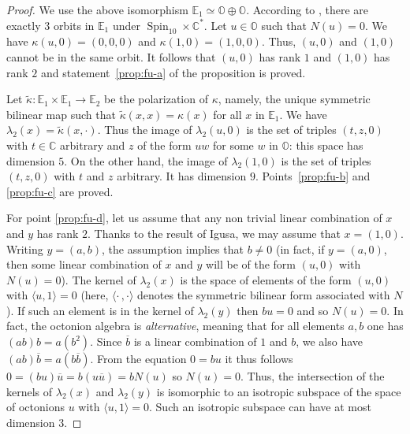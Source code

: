 \documentclass[10pt]{amsart}
\newcommand{\citestar}[3]{\cite[#3]{#1}}
\theoremstyle{plain}
\theoremstyle{definition}
\let\ov\overline
\DeclareMathOperator{\Spin}{Spin}
\newcommand{\bC}{\mathbb{C}}
\newcommand{\bE}{\mathbb{E}}
\newcommand{\bO}{\mathbb{O}}
\newcommand{\scal}[1]{\langle #1 \rangle}
\begin{document}
\begin{proof}
We use the above isomorphism $\bE_1 \simeq \bO \oplus \bO$. According to \citestar{igusa}*{Prop.\,2}, there are exactly
$3$ orbits in $\bE_1$ under $\Spin_{10} \times \bC^*$.
Let $u \in \bO$ such that $N(u)=0$. We have
$\kappa(u,0)=(0,0,0)$ and $\kappa(1,0)=(1,0,0)$. Thus, $(u,0)$ and $(1,0)$ cannot be in the same orbit.
It follows that $(u,0)$ has rank $1$ and $(1,0)$ has rank $2$ and statement~\eqref{prop:fu-a} of the proposition is
proved.

Let $\tilde \kappa: \bE_1 \times \bE_1 \to \bE_2$ be the polarization of $\kappa$, namely, the unique
symmetric bilinear map such that $\tilde \kappa (x, x) = \kappa (x)$ for all $x$ in $\bE_1$.
We have $\lambda_2(x)=\tilde \kappa (x, \cdot)$. Thus the image of $\lambda_2(u,0)$ is the set of triples
$(t,z,0)$ with $t \in \bC$ arbitrary and $z$ of the form $uw$ for some $w$ in $\bO$: this space
has dimension $5$. On the other hand, the image of $\lambda_2(1,0)$ is the set of triples
$(t,z,0)$ with $t$ and $z$ arbitrary. It has dimension $9$. Points~\eqref{prop:fu-b} and \eqref{prop:fu-c} are
proved.

For point \eqref{prop:fu-d}, let us assume that any non trivial linear combination of $x$ and $y$ has rank $2$. Thanks to the
result of Igusa, we may assume that $x=(1,0)$. Writing $y=(a,b)$, the assumption implies that $b \neq 0$
(in fact, if $y=(a,0)$, then some linear combination of $x$ and $y$ will be of the form $(u,0)$ with
$N(u)=0$). The kernel of $\lambda_2(x)$ is the space of elements of the form $(u,0)$ with $\scal{u,1}=0$
(here, $\scal{\cdot\,, \cdot}$ denotes the symmetric bilinear form associated with $N$).
If such an element is in the kernel of $\lambda_2(y)$ then $bu=0$ and so $N(u)=0$.
In fact, the octonion algebra is \emph{alternative}, meaning that for all elements $a,b$ one has
$(ab)b=a(b^2)$. Since $\ov b$ is a linear combination of $1$ and $b$, we also have
$(ab)\ov b=a(b \ov b)$.
From the equation $0=bu$ it thus follows $0=(bu)\ov u=b(u \ov u)=bN(u)$ so
$N(u)=0$.
Thus, the intersection of
the kernels of $\lambda_2(x)$ and $\lambda_2(y)$ is isomorphic to an isotropic subspace of the space of
octonions $u$ with $\scal{u,1}=0$.
Such an isotropic subspace can have at most dimension $3$.


\end{proof}
\end{document}
